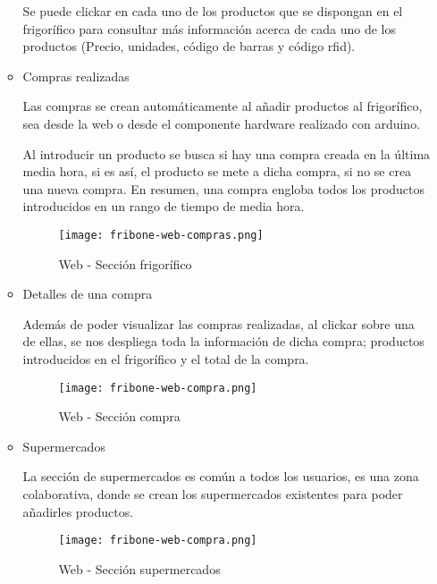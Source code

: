 \begin{itemize}
\begin{itemize}
                Se puede clickar en cada uno de los productos que se dispongan en el frigorífico para consultar más información acerca de cada uno de los productos (Precio, unidades, código de barras y código rfid).

                \item Compras realizadas

                Las compras se crean automáticamente al añadir productos al frigorífico, sea desde la web o desde el componente hardware realizado con arduino.

                Al introducir un producto se busca si hay una compra creada en la última media hora, si es así, el producto se mete a dicha compra, si no se crea una nueva compra. En resumen, una compra engloba todos los productos introducidos en un rango de tiempo de media hora.

                \begin{figure}[H]
                    \centering
                    \texttt{[image: fribone-web-compras.png]}
                    \caption{Web - Sección frigorífico}\label{fig:fribone-web-comras}
                \end{figure}

                \item Detalles de una compra

                Además de poder visualizar las compras realizadas, al clickar sobre una de ellas, se nos despliega toda la información de dicha compra; productos introducidos en el frigorífico y el total de la compra.

                \begin{figure}[H]
                    \centering
                    \texttt{[image: fribone-web-compra.png]}
                    \caption{Web - Sección compra}\label{fig:fribone-web-compra}
                \end{figure}

                \item Supermercados

                    La sección de supermercados es común a todos los usuarios, es una zona colaborativa, donde se crean los supermercados existentes para poder añadirles productos.

                    \begin{figure}[H]
                        \centering
                        \texttt{[image: fribone-web-compra.png]}
                        \caption{Web - Sección supermercados}\label{fig:fribone-web-compra}
                    \end{figure}


\end{itemize}
\end{itemize}
